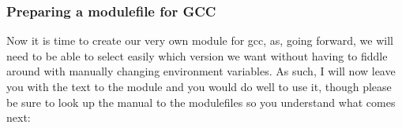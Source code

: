 \documentclass[]{article}
\begin{document}
                                                                                                                                                                                                                       \subsubsection{Preparing a modulefile for GCC}
                                                                                                                                                                                                                       Now it is time to create our very own module for gcc, as, going forward, we will need to be able to select easily which version we want
                                                                                                                                                                                                                       without having to fiddle around with manually changing environment variables. As such, I will now leave you with the text to the module
                                                                                                                                                                                                                       and you would do well to use it, though please be sure to look up the manual to the modulefiles so you understand what comes next:
\end{document}
